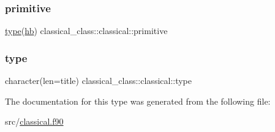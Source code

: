 \mbox{\label{structclassical__class_1_1classical_ae02517eaafa051141de41d949d7be0ef}} 
\subsubsection{\texorpdfstring{primitive}{primitive}}
{\footnotesize\ttfamily \hyperlink{structclassical__class_1_1classical_a4c835c43f9359c512790ebce83387d63}{type}(\hyperlink{structhb__class_1_1hb}{hb}) classical\+\_\+class\+::classical\+::primitive\hspace{0.3cm}{\ttfamily [private]}}

\mbox{\label{structclassical__class_1_1classical_a4c835c43f9359c512790ebce83387d63}} 
\subsubsection{\texorpdfstring{type}{type}}
{\footnotesize\ttfamily character(len=title) classical\+\_\+class\+::classical\+::type\hspace{0.3cm}{\ttfamily [private]}}



The documentation for this type was generated from the following file\+:\begin{DoxyCompactItemize}
\item 
src/\hyperlink{classical_8f90}{classical.\+f90}\end{DoxyCompactItemize}
